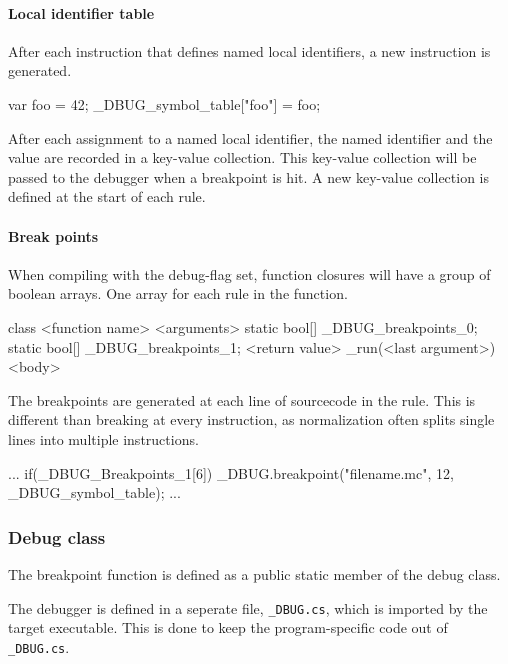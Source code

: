 \paragraph{Local identifier table}
After each instruction that defines named local identifiers, a new instruction is generated.

\begin{code}
    var foo = 42;
    _DBUG_symbol_table["foo"] = foo;
\end{code}

After each assignment to a named local identifier, the named identifier and the value are recorded in a key-value collection. 
This key-value collection will be passed to the debugger when a breakpoint is hit.
A new key-value collection is defined at the start of each rule.

\paragraph{Break points}
When compiling with the debug-flag set, function closures will have a group of boolean arrays.
One array for each rule in the function.

\begin{code}
    class <function name>{
        <arguments>
        static bool[] _DBUG_breakpoints_0;
        static bool[] _DBUG_breakpoints_1;
        <return value> _run(<last argument>){
            <body> 
        }
    }
\end{code}

The breakpoints are generated at each line of sourcecode in the rule.
This is different than breaking at every instruction, as normalization often splits single lines into multiple instructions.

\begin{code}
    ...
    if(_DBUG_Breakpoints_1[6]){
        _DBUG.breakpoint("filename.mc", 12, 
                         _DBUG_symbol_table);
    }
    ...
\end{code}

\subsubsection{Debug class}
The breakpoint function is defined as a public static member of the debug class.

The debugger is defined in a seperate file, \verb|_DBUG.cs|, which is imported by the target executable.
This is done to keep the program-specific code out of \verb|_DBUG.cs|.


